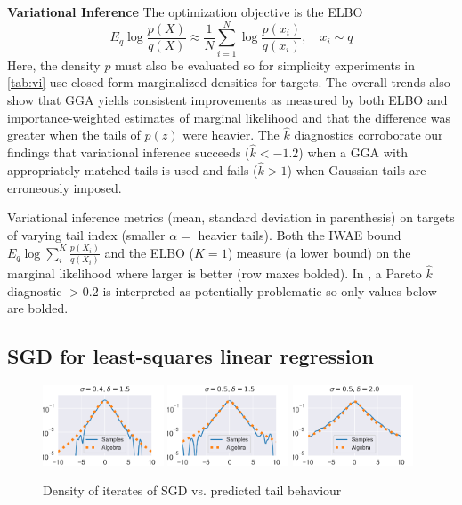 \documentclass[thesis.tex]{subfiles}
\begin{document}
\textbf{Variational Inference} The optimization objective is the ELBO
\[
    E_q \log \frac{p(X)}{q(X)} \approx \frac{1}{N} \sum_{i=1}^N \log \frac{p(x_i)}{q(x_i)},\quad x_i \sim q
\]
Here, the density $p$ must also be evaluated so for simplicity
experiments in \cref{tab:vi} use closed-form marginalized densities for targets.
The overall trends also show that GGA yields consistent improvements as measured by both ELBO and importance-weighted
estimates of marginal likelihood and that the difference was greater when the tails of $p(z)$ were heavier.
The $\hat{k}$ diagnostics \citep{yao2018yes} corroborate our findings that variational inference succeeds
($\hat{k} < -1.2$) when a GGA with appropriately matched tails is used and fails ($\hat{k} > 1$) when
Gaussian tails are erroneously imposed.

\begin{table}[h]
	\centering
	\caption{Variational inference metrics (mean, standard deviation in parenthesis)
	on targets of varying tail index (smaller $\alpha =$ heavier tails). Both the IWAE bound $E_q \log \sum_i^K \frac{p(X_i)}{q(X_i)}$ and the ELBO ($K=1$) measure (a lower bound) on the marginal likelihood where larger is better (row maxes bolded). In \citet{yao2018yes},
	a Pareto $\hat{k}$ diagnostic $> 0.2$ is interpreted as potentially problematic so only values below are bolded.}
	\label{tab:vi}
	\small
\end{table}

\subsection{SGD for least-squares linear regression}

\begin{figure}[ht]
\centering
\includegraphics[width=0.32\textwidth]{figures/Kesten_0.40_1.5.png}
\includegraphics[width=0.32\textwidth]{figures/Kesten_0.50_1.5.png}
\includegraphics[width=0.32\textwidth]{figures/Kesten_0.50_2.png}
\caption{\label{fig:SGD}Density of iterates of SGD vs. predicted tail behaviour}
\end{figure}
\end{document}
